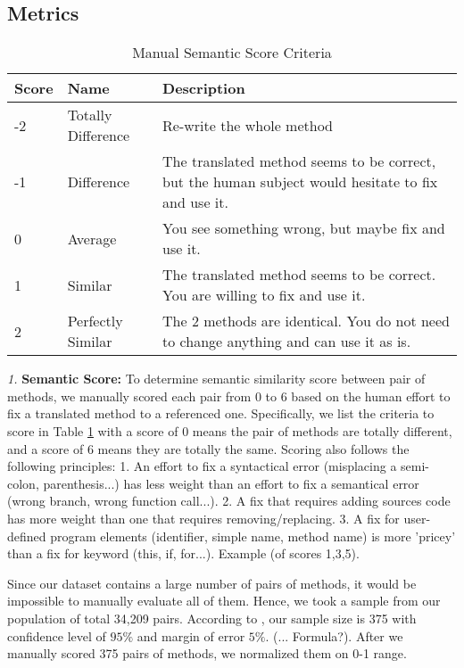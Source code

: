 \subsection{Metrics}
\begin{table}
\begin{tabular}{|p{0.7cm}|p{1.5cm}|p{5cm}|}
\hline
Score & Name & Description \\
\hline
-2 & Totally Difference & Re-write the whole method \\
-1 &  Difference & The translated method seems to be correct, but the human subject would hesitate to fix and use it. \\
0 & Average & You see something wrong, but maybe fix and use it. \\
1 & Similar & The translated method seems to be correct. You are willing to fix and use it. \\
2 & Perfectly Similar & The 2 methods are identical. You do not need to change anything and can use it as is. \\

\hline
\end{tabular}
\caption{Manual Semantic Score Criteria}
\label{table:criteria}
\end{table}

\emph{1.} \textbf{Semantic Score:} To determine semantic similarity score between pair of methods, we manually scored each pair from 0 to 6 based on the human effort to fix a translated method to a referenced one. Specifically, we list the criteria to score in Table \ref{table:criteria} with a score of 0 means the pair of methods are totally different, and a score of 6 means they are totally the same. Scoring also follows the following principles: 1. An effort to fix a syntactical error (misplacing a semi-colon, parenthesis...) has less weight than an effort to fix a semantical error (wrong branch, wrong function call...). 2. A fix that requires adding sources code has more weight than one that requires removing/replacing. 3. A fix for user-defined program elements (identifier, simple name, method name) is more 'pricey' than a fix for keyword (this, if, for...). Example (of scores 1,3,5). 

Since our dataset contains a large number of pairs of methods, it would be impossible to manually evaluate all of them. Hence, we took a sample from our population of total 34,209 pairs. According to \cite{website}, our sample size is 375 with confidence level of $95\%$ and margin of error $5\%$. 
(... Formula?). After we manually scored 375 pairs of methods, we normalized them on 0-1 range.

